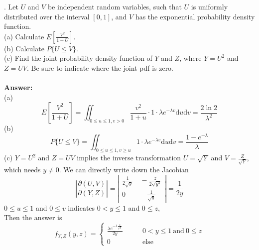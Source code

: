 \documentclass[onecolumn, 12pt]{IEEEtran}
\newcommand{\dd}{\mathrm{d}}
\begin{document}
. Let $U$ and $V$ be independent random variables, such that $U$ is uniformly distributed over the interval
$[0, 1]$, and $V$ has the exponential probability density function.\\
(a) Calculate $E[\frac{V^2}{1+U}]$.\\
(b) Calculate $P\{U\le V\}$.\\
(c) Find the joint probability density function of $Y$ and $Z$, where $Y = U^2$ and $Z = UV$. Be sure to
indicate where the joint pdf is zero.\\
\noindent 
\vspace*{0.1in}\\
\noindent 
{\bf Answer:}\\
\noindent (a) 
\begin{equation*}
E[\frac{V^2}{1+U}]=\iint_{0 \le u \le 1, v > 0}\frac{v^2}{1+u}\cdot 1\cdot \lambda e^{-\lambda v}\dd u\dd v=\frac{2\ln 2}{\lambda^2}
\end{equation*}
\noindent(b) 
\begin{equation*}
P\{U\le V\}=\iint_{0 \le u \le 1, v \ge u}1\cdot \lambda e^{-\lambda v}\dd u\dd v=\frac{1-e^{-\lambda}}{\lambda}
\end{equation*}
\noindent(c) $Y = U^2$ and $Z = UV$ implies the inverse transformation $U=\sqrt{Y}$ and $V=\frac{Z}{\sqrt{Y}}$, which needs $y \ne 0$. We can directly write down the Jacobian
\begin{equation*}
\left|\frac{\partial(U,V)}{\partial(Y,Z)}\right|=\left|\begin{aligned}\frac{1}{2\sqrt{y}} & \ -\frac{z}{2\sqrt{y^3}}\\ 0 & \quad\ \frac{1}{\sqrt{y}} \end{aligned}\right|=\frac{1}{2y}
\end{equation*}
$0 \le u \le 1$ and $0 \le v $ indicates $0 < y \le 1 $ and $0 \le z$,\\
Then the answer is 
\begin{equation*}
f_{Y,Z}(y,z)=\left\{
\begin{aligned}
\frac{\lambda e^{-\lambda\frac{z}{\sqrt{y}}}}{2y}&\qquad 0 < y \le 1 \ \mathrm{and}\   0 \le z\\
0 \quad&\qquad\mathrm{else}
\end{aligned}
\right.
\end{equation*}
\vspace*{0.3in}
\end{document}
